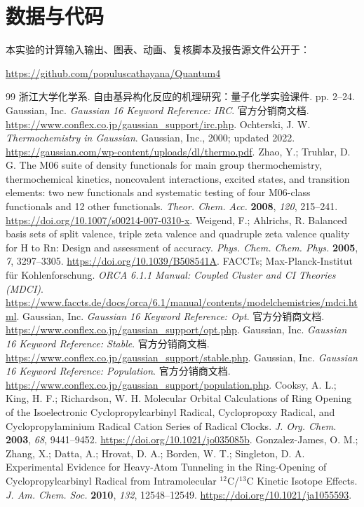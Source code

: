 \documentclass[UTF8,a4paper,12pt,fontset=fandol]{ctexart}
\begin{document}
\section*{数据与代码}
本实验的计算输入输出、图表、动画、复核脚本及报告源文件公开于：

\noindent\url{https://github.com/populuscathayana/Quantum4}

\clearpage
\begingroup\fontsize{10.5pt}{15pt}\selectfont
\begin{thebibliography}{99}
 浙江大学化学系. 自由基异构化反应的机理研究：量子化学实验课件. pp. 2--24.
 Gaussian, Inc. \textit{Gaussian 16 Keyword Reference: IRC}. 官方分销商文档. \url{https://www.conflex.co.jp/gaussian_support/irc.php}.
 Ochterski, J. W. \textit{Thermochemistry in Gaussian}. Gaussian, Inc., 2000; updated 2022. \url{https://gaussian.com/wp-content/uploads/dl/thermo.pdf}.
 Zhao, Y.; Truhlar, D. G. The M06 suite of density functionals for main group thermochemistry, thermochemical kinetics, noncovalent interactions, excited states, and transition elements: two new functionals and systematic testing of four M06-class functionals and 12 other functionals. \textit{Theor. Chem. Acc.} \textbf{2008}, \textit{120}, 215--241. \url{https://doi.org/10.1007/s00214-007-0310-x}.
 Weigend, F.; Ahlrichs, R. Balanced basis sets of split valence, triple zeta valence and quadruple zeta valence quality for H to Rn: Design and assessment of accuracy. \textit{Phys. Chem. Chem. Phys.} \textbf{2005}, \textit{7}, 3297--3305. \url{https://doi.org/10.1039/B508541A}.
 FACCTs; Max-Planck-Institut f\"ur Kohlenforschung. \textit{ORCA 6.1.1 Manual: Coupled Cluster and CI Theories (MDCI)}. \url{https://www.faccts.de/docs/orca/6.1/manual/contents/modelchemistries/mdci.html}.
 Gaussian, Inc. \textit{Gaussian 16 Keyword Reference: Opt}. 官方分销商文档. \url{https://www.conflex.co.jp/gaussian_support/opt.php}.
 Gaussian, Inc. \textit{Gaussian 16 Keyword Reference: Stable}. 官方分销商文档. \url{https://www.conflex.co.jp/gaussian_support/stable.php}.
 Gaussian, Inc. \textit{Gaussian 16 Keyword Reference: Population}. 官方分销商文档. \url{https://www.conflex.co.jp/gaussian_support/population.php}.
 Cooksy, A. L.; King, H. F.; Richardson, W. H. Molecular Orbital Calculations of Ring Opening of the Isoelectronic Cyclopropylcarbinyl Radical, Cyclopropoxy Radical, and Cyclopropylaminium Radical Cation Series of Radical Clocks. \textit{J. Org. Chem.} \textbf{2003}, \textit{68}, 9441--9452. \url{https://doi.org/10.1021/jo035085b}.
 Gonzalez-James, O. M.; Zhang, X.; Datta, A.; Hrovat, D. A.; Borden, W. T.; Singleton, D. A. Experimental Evidence for Heavy-Atom Tunneling in the Ring-Opening of Cyclopropylcarbinyl Radical from Intramolecular $^{12}$C/$^{13}$C Kinetic Isotope Effects. \textit{J. Am. Chem. Soc.} \textbf{2010}, \textit{132}, 12548--12549. \url{https://doi.org/10.1021/ja1055593}.
\end{thebibliography}
\endgroup
\end{document}
